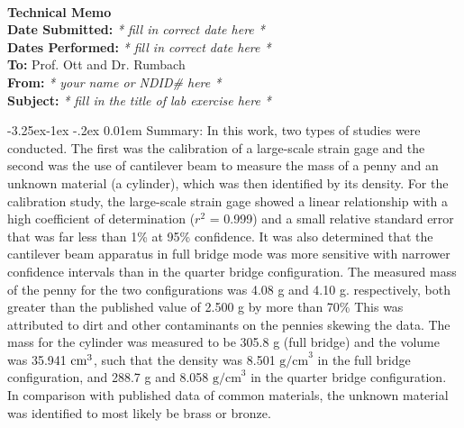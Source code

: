 \documentclass[12pt, letterpaper]{article}
\newcommand{\z}[1]{\text{#1}} %
\begin{document}
\makeatletter
\renewcommand\paragraph{%
    \@startsection{paragraph}{4}{\z@}%
    {-3.25ex\@plus -1ex \@minus -.2ex}%
    {0.01em}%
    {\normalfont\normalsize\bfseries}}
\makeatother

 \\
{\bf Technical Memo} 
\\{\bf Date Submitted: } \textit{* fill in correct date here *}
\\{\bf Dates Performed: } \textit{* fill in correct date here *}
\\{\bf To: } Prof. Ott and Dr. Rumbach
\\{\bf From: } \textit{* your name or NDID\# here *}
\\{\bf Subject: } \textit{* fill in the title of lab exercise here *}

\doublespacing
\paragraph{Summary:} In this work, two types of studies were conducted. The
first was the calibration of a large-scale strain gage and the second was the
use of cantilever beam to measure the mass of a penny and an unknown material
(a cylinder), which was then identified by its density. For the calibration
study, the large-scale strain gage showed a linear relationship with a high
coefficient of determination ($r^2$ = 0.999) and a small relative standard
error that was far less than 1\% at 95\% confidence. It was also determined
that the cantilever beam apparatus in full bridge mode was more sensitive with
narrower confidence intervals than in the quarter bridge configuration. The
measured mass of the penny for the two configurations was 4.08 g and 4.10 g.
respectively, both greater than the published value of 2.500 g by more than
70\% This was attributed to dirt and other contaminants on the pennies skewing
the data. The mass for the cylinder was measured to be 305.8 g (full bridge)
and the volume was 35.941 $\z{\z{cm}}^3$, such that the density was 8.501
$\z{g/cm}^3$ in the full bridge configuration, and 288.7 g and 8.058
$\z{g/cm}^3$ in the quarter bridge configuration. In comparison with published
data of common materials, the unknown material was identified to most likely be
brass or bronze.
\end{document}
